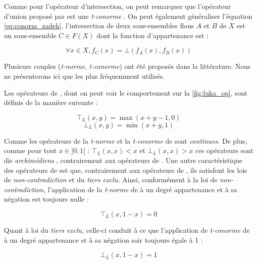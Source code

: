 Comme pour l'opérateur d'intersection, on peut remarquer que
l'opérateur d'union proposé par \textcite{Zadeh1965} est une
\emph{t-conorme} \autocite{Bouchon-Meunier2007}. On peut également
généraliser l'équation \ref{eq:conorm_zadeh}, l'intersection de deux
sous-ensembles flous \(A\) et \(B\) de \(X\) est un sous-ensemble
\(C ∈ F(X)\) dont la fonction d’appartenance est :

\begin{equation}
     ∀x ∈ X, f_C (x) = ⊥(f_A(x), f_B(x))  
\end{equation}

Plusieurs couples (\emph{t-norme}, \emph{t-conorme}) ont été proposés
dans la littérature. Nous ne présenterons ici que les plus fréquemment
utilisés. 

Les opérateurs de , dont on peut voir le comportement sur
la \autoref{fig:luka_op}, sont définis de la manière suivante :

\begin{equation}
  \label{eq:norm_luka}
  ⊤_L(x,y) = \max(x + y - 1, 0) 
\end{equation}
%
\begin{equation}
  \label{eq:conorm_luka}
  ⊥_L(x,y) = \min(x + y, 1)
\end{equation}

Comme les opérateurs de \textcite{Zadeh1965} la \emph{t-norme} et la
\emph{t-conorme} de  sont \emph{continues.} De plus,
comme pour tout \(x \in ]0,1[\) : \(⊤_L(x,x) < x\) et
\( ⊥_L(x,x) > x\) ces opérateurs sont dis \emph{archimédiens}
\autocite{Bouchon-Meunier1995}, contrairement aux opérateurs de
\textcite{Zadeh1965}. Une autre caractéristique des opérateurs de
 est que, contrairement aux opérateurs de
\textcite{Zadeh1965}, ils satisfont les lois de
\emph{non-contradiction} et du \emph{tiers exclu.} Ainsi, conformément
à la loi de \emph{non-contradiction,} l’application de la
\emph{t-norme} de  à un degré appartenance et à sa
négation est toujours nulle :

\begin{equation}
  ⊤_L(x,1-x) = 0
\end{equation}

Quant à loi du \emph{tiers exclu,} celle-ci conduit à ce que
l’application de \emph{t-conorme} de  à un degré
appartenance et à sa négation soir toujours égale à 1 :
 
\begin{equation}
  ⊥_L(x,1-x) = 1
\end{equation}

